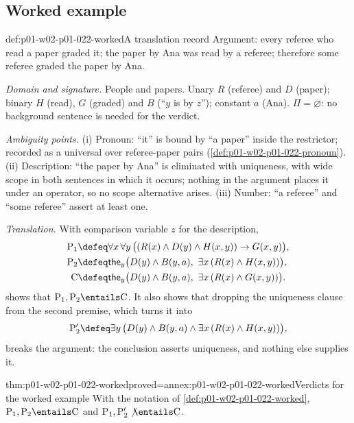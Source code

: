 \subsection{Worked example}
\label{sec:p01-w02-p01-022-worked}

\begin{hbexample}{def:p01-w02-p01-022-worked}{A translation record}
Argument: every referee who read a paper graded it; the paper by Ana was
read by a referee; therefore some referee graded the paper by Ana.

\emph{Domain and signature.} People and papers. Unary \(R\) (referee) and
\(D\) (paper); binary \(H\) (read), \(G\) (graded) and \(B\) (``\(y\) is
by \(z\)''); constant \(a\) (Ana). \(\Pi=\varnothing\): no background
sentence is needed for the verdict.

\emph{Ambiguity points.} (i) Pronoun: ``it'' is bound by ``a paper'' inside
the restrictor; recorded as a universal over referee-paper pairs
(\cref{def:p01-w02-p01-022-pronoun}). (ii) Description: ``the paper by Ana''
is eliminated with uniqueness, with wide scope in both sentences in which it
occurs; nothing in the argument places it under an operator, so no scope
alternative arises. (iii) Number: ``a referee'' and ``some referee'' assert
at least one.

\emph{Translation.} With comparison variable \(z\) for the description,
\[
\begin{aligned}
  \mathrm{P}_1&\defeq\forall x\,\forall y\,\bigl((R(x)\land D(y)\land
       H(x,y))\to G(x,y)\bigr),\\
  \mathrm{P}_2&\defeq\mathsf{the}_y\bigl(D(y)\land B(y,a),\
       \exists x\,(R(x)\land H(x,y))\bigr),\\
  \mathrm{C}&\defeq\mathsf{the}_y\bigl(D(y)\land B(y,a),\
       \exists x\,(R(x)\land G(x,y))\bigr).
\end{aligned}
\]
 shows that \(\mathrm{P}_1,\mathrm{P}_2
\entails\mathrm{C}\). It also shows that dropping the uniqueness clause from
the second premise, which turns it into
\[
  \mathrm{P}_2'\defeq\exists y\,\bigl(D(y)\land B(y,a)\land
  \exists x\,(R(x)\land H(x,y))\bigr),
\]
breaks the argument: the conclusion asserts uniqueness, and
nothing else supplies it.
\end{hbexample}

\begin{hbtheorem}{thm:p01-w02-p01-022-worked}{proved=annex:p01-w02-p01-022-worked}{Verdicts for the worked example}
With the notation of \cref{def:p01-w02-p01-022-worked},
\(\mathrm{P}_1,\mathrm{P}_2\entails\mathrm{C}\) and
\(\mathrm{P}_1,\mathrm{P}_2'\not\entails\mathrm{C}\).
\end{hbtheorem}


